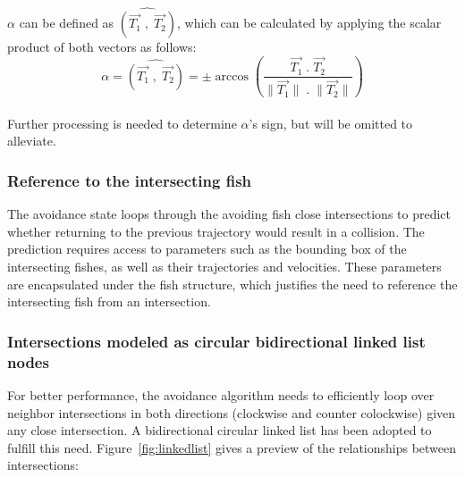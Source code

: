 $\alpha$ can be defined as  $\widehat{(\overrightarrow{T_1} \; , \; \overrightarrow{T_2})}$, which can be calculated by applying the scalar product of both vectors as follows:\\

\[
\alpha = \widehat{(\overrightarrow{T_1} \; , \; \overrightarrow{T_2})} = 
\pm \arccos \left(
\frac{\displaystyle \overrightarrow{T_1} \; . \; \overrightarrow{T_2}} {\displaystyle \| \overrightarrow{T_1} \| \; . \; \| \overrightarrow{T_2} \|} 
\right)
\] \\
Further processing is needed to determine $\alpha$'s sign, but will be omitted to alleviate.

\subsubsection{Reference to the intersecting fish}

The avoidance state loops through the avoiding fish close intersections to predict whether returning to the previous trajectory would result in a collision. The prediction requires access to parameters such as the bounding box of the intersecting fishes, as well as their trajectories and velocities. These parameters are encapsulated under the fish structure, which justifies the need to reference the intersecting fish from an intersection.


\subsubsection{Intersections modeled as circular bidirectional linked list nodes }
For better performance, the avoidance algorithm needs to efficiently loop over neighbor intersections in both directions (clockwise and counter colockwise) given any close intersection. A bidirectional circular linked list has been adopted to fulfill this need. Figure~\ref{fig:linkedlist} gives a preview of the relationships between intersections:

